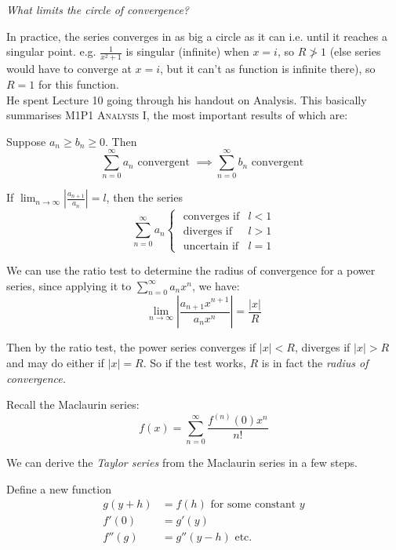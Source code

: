\documentclass[twoside]{scrartcl}
\begin{document}
\emph{What limits the circle of convergence?}

In practice, the series converges in as big a circle as it can i.e. until it reaches a singular point. e.g. $\frac{1}{x^2+1}$ is singular (infinite) when $x=i$, so $R \ngtr 1$ (else series would have to converge at $x = i$, but it can't as function is infinite there), so $R = 1$ for this function.\\


He spent Lecture 10  going through his handout on Analysis. This basically summarises \textsc{M1P1 Analysis I}, the most important results of which are: 

\begin{theorem}
Suppose $a_n \geq b_n \geq 0$. Then 
\[\sum_{n=0}^{\infty} a_n \text{ convergent } \implies \sum_{n=0}^{\infty} b_n \text{ convergent }  \]	
\end{theorem}\vspace*{5pt}
 

\begin{theorem}
	If $\lim_{n\to \infty} \left|\frac{a_{n+1}}{a_n}\right| = l$, then the series 
	\[\sum_{n=0}^{\infty} a_n \begin{cases}
 \text{ converges if} & l < 1\\
 \text{ diverges if} & l > 1\\
 \text{ uncertain if} & l = 1	
 \end{cases}
\]
\end{theorem}

We can use the ratio test to determine the radius of convergence for a power series, since applying it to $\sum_{n=0}^{\infty} a_n x^n$, we have:  
\[\lim_{n\to \infty} \left|\frac{a_{n+1}x^{n+1}}{a_nx^n}\right| = \frac{|x|}{R}\]

Then by the ratio test, the power series converges if $|x| < R$, diverges if $|x| > R$ and may do either if $|x| = R$. So if the test works, $R$ is in fact the \emph{radius of convergence.}


Recall  
the Maclaurin series: 
\[f(x) = \sum_{n=0}^{\infty} \frac{f^{(n)}(0)x^n}{n!}\]

We can derive the \emph{Taylor series} from the Maclaurin series in a few steps. 

Define a new function 
\[
\begin{aligned}
  g(y + h) &= f(h) \text{ for some constant } y\\
  f'(0) &= g'(y)\\
  f''(g) &= g''(y-h) \text{ etc.} 
\end{aligned}
\]
\end{document}
